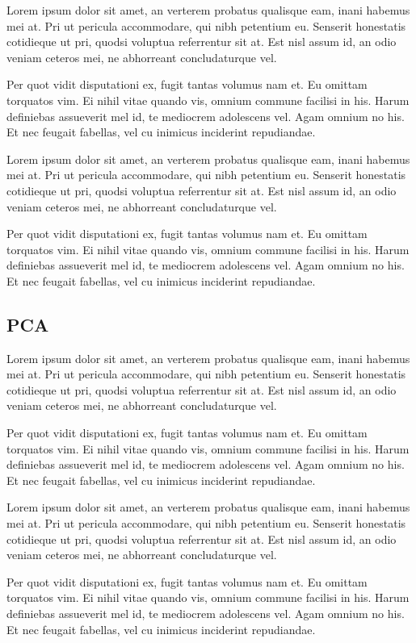 \documentclass[11pt,fleqn]{book} %
\begin{document}
	Lorem ipsum dolor sit amet, an verterem probatus qualisque eam, inani habemus mei at. Pri ut pericula accommodare, qui nibh petentium eu. Senserit honestatis cotidieque ut pri, quodsi voluptua referrentur sit at. Est nisl assum id, an odio veniam ceteros mei, ne abhorreant concludaturque vel.

Per quot vidit disputationi ex, fugit tantas volumus nam et. Eu omittam torquatos vim. Ei nihil vitae quando vis, omnium commune facilisi in his. Harum definiebas assueverit mel id, te mediocrem adolescens vel. Agam omnium no his. Et nec feugait fabellas, vel cu inimicus inciderint repudiandae.

Lorem ipsum dolor sit amet, an verterem probatus qualisque eam, inani habemus mei at. Pri ut pericula accommodare, qui nibh petentium eu. Senserit honestatis cotidieque ut pri, quodsi voluptua referrentur sit at. Est nisl assum id, an odio veniam ceteros mei, ne abhorreant concludaturque vel.

Per quot vidit disputationi ex, fugit tantas volumus nam et. Eu omittam torquatos vim. Ei nihil vitae quando vis, omnium commune facilisi in his. Harum definiebas assueverit mel id, te mediocrem adolescens vel. Agam omnium no his. Et nec feugait fabellas, vel cu inimicus inciderint repudiandae.

\subsection{PCA}
Lorem ipsum dolor sit amet, an verterem probatus qualisque eam, inani habemus mei at. Pri ut pericula accommodare, qui nibh petentium eu. Senserit honestatis cotidieque ut pri, quodsi voluptua referrentur sit at. Est nisl assum id, an odio veniam ceteros mei, ne abhorreant concludaturque vel.

Per quot vidit disputationi ex, fugit tantas volumus nam et. Eu omittam torquatos vim. Ei nihil vitae quando vis, omnium commune facilisi in his. Harum definiebas assueverit mel id, te mediocrem adolescens vel. Agam omnium no his. Et nec feugait fabellas, vel cu inimicus inciderint repudiandae.

Lorem ipsum dolor sit amet, an verterem probatus qualisque eam, inani habemus mei at. Pri ut pericula accommodare, qui nibh petentium eu. Senserit honestatis cotidieque ut pri, quodsi voluptua referrentur sit at. Est nisl assum id, an odio veniam ceteros mei, ne abhorreant concludaturque vel.

Per quot vidit disputationi ex, fugit tantas volumus nam et. Eu omittam torquatos vim. Ei nihil vitae quando vis, omnium commune facilisi in his. Harum definiebas assueverit mel id, te mediocrem adolescens vel. Agam omnium no his. Et nec feugait fabellas, vel cu inimicus inciderint repudiandae.
\end{document}
